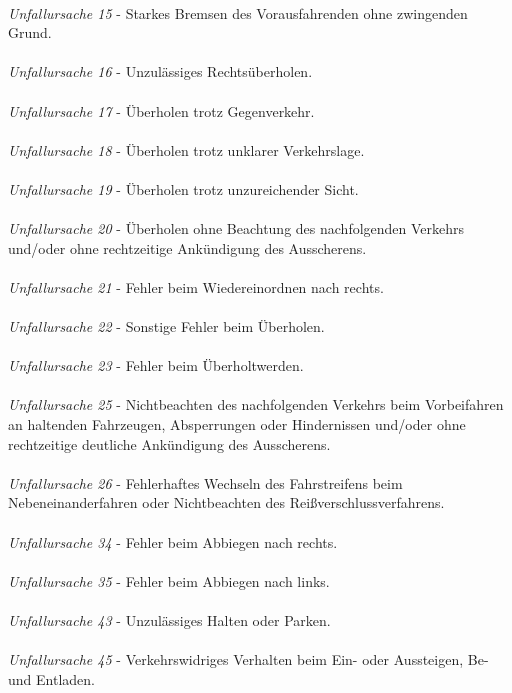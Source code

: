 \\
\textit{Unfallursache 15} - Starkes Bremsen des Vorausfahrenden ohne zwingenden Grund.\\
\\
\textit{Unfallursache 16} - Unzulässiges Rechtsüberholen.\\
\\
\textit{Unfallursache 17} - Überholen trotz Gegenverkehr.\\
\\
\textit{Unfallursache 18} - Überholen trotz unklarer Verkehrslage.\\
\\
\textit{Unfallursache 19} - Überholen trotz unzureichender Sicht.\\
\\
\textit{Unfallursache 20} - Überholen ohne Beachtung des nachfolgenden Verkehrs und/oder ohne rechtzeitige Ankündigung des Ausscherens.\\
\\
\textit{Unfallursache 21} - Fehler beim Wiedereinordnen nach rechts.\\
\\
\textit{Unfallursache 22} - Sonstige Fehler beim Überholen.\\
\\
\textit{Unfallursache 23} - Fehler beim Überholtwerden.\\
\\
\textit{Unfallursache 25} - Nichtbeachten des nachfolgenden Verkehrs beim Vorbeifahren an haltenden Fahrzeugen, Absperrungen oder Hindernissen und/oder ohne rechtzeitige deutliche Ankündigung des Ausscherens.\\
\\
\textit{Unfallursache 26} - Fehlerhaftes Wechseln des Fahrstreifens beim Nebeneinanderfahren oder Nichtbeachten des Reißverschlussverfahrens.\\
\\
\textit{Unfallursache 34} - Fehler beim Abbiegen nach rechts.\\
\\
\textit{Unfallursache 35} - Fehler beim Abbiegen nach links.\\
\\
\textit{Unfallursache 43} - Unzulässiges Halten oder Parken.\\
\\
\textit{Unfallursache 45} - Verkehrswidriges Verhalten beim Ein- oder Aussteigen, Be- und Entladen.\\
\\
